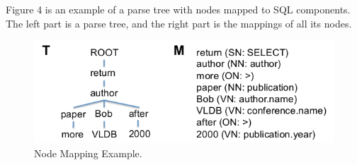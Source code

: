 \documentclass[twocolumn]{article}
\begin{document}
Figure 4 is an example of a parse tree with nodes mapped to SQL components. The left part is a parse tree, and the right part is the mappings of all its nodes.

\begin{figure}[ht]
  \centering
  \includegraphics[width=0.9\linewidth]{figures/nodes_mapping_example.png}
  \caption[caption for nodes mapping example]{Node Mapping Example.\protect\footnotemark }
\end{figure}
\end{document}
